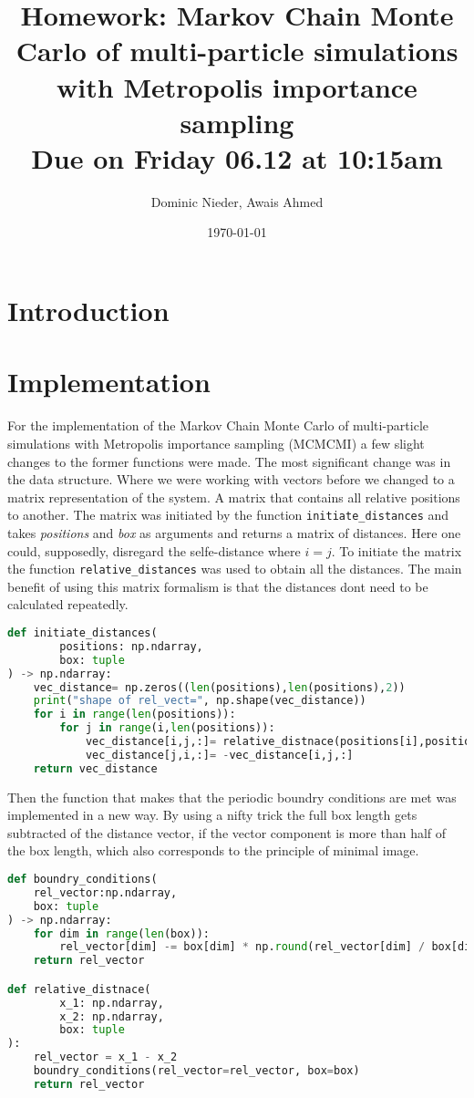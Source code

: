 \documentclass{article}[a4paper]
\title{
    \vspace{2in}
    \textmd{\textbf{Homework: Markov Chain Monte Carlo of multi-particle simulations with Metropolis importance sampling}}\\
    \normalsize\vspace{0.1in}\small{Due on Friday 06.12 at 10:15am}\\
    \vspace{0.1in}
    \vspace{3in}
}
\author{Dominic Nieder, Awais Ahmed}
\date{\today}
\begin{document}
\section{Introduction}

\section{Implementation}

For the implementation of the Markov Chain Monte Carlo of multi-particle simulations with Metropolis importance sampling (MCMCMI) a few slight changes to the former functions were made.
The most significant change was in the data structure.
Where we were working with vectors before we changed to a matrix representation of the system. 
A matrix that contains all relative positions to another. 
The matrix was initiated by the function \texttt{initiate\_distances} and takes \textit{positions} and \textit{box} as arguments and returns a matrix of distances. 
Here one could, supposedly, disregard the selfe-distance where $i=j$.
To initiate the matrix the function \texttt{relative\_distances} was used to obtain all the distances.
The main benefit of using this matrix formalism is that the distances dont need to be calculated repeatedly.
\begin{lstlisting}[language=Python]
def initiate_distances(
        positions: np.ndarray,
        box: tuple
) -> np.ndarray:
    vec_distance= np.zeros((len(positions),len(positions),2))
    print("shape of rel_vect=", np.shape(vec_distance))
    for i in range(len(positions)):
        for j in range(i,len(positions)):
            vec_distance[i,j,:]= relative_distnace(positions[i],positions[j], box=box)
            vec_distance[j,i,:]= -vec_distance[i,j,:]
    return vec_distance
\end{lstlisting}

Then the function that makes that the periodic boundry conditions are met was implemented in a new way. By using a nifty trick the full box length gets subtracted of the distance vector, if the vector component is more than half of the box length, which also corresponds to the principle of minimal image.
\begin{lstlisting}[language=Python]
def boundry_conditions(
    rel_vector:np.ndarray,
    box: tuple
) -> np.ndarray:
    for dim in range(len(box)):
        rel_vector[dim] -= box[dim] * np.round(rel_vector[dim] / box[dim])
    return rel_vector

def relative_distnace(
        x_1: np.ndarray, 
        x_2: np.ndarray, 
        box: tuple
):
    rel_vector = x_1 - x_2
    boundry_conditions(rel_vector=rel_vector, box=box)
    return rel_vector 
\end{lstlisting}
\end{document}
